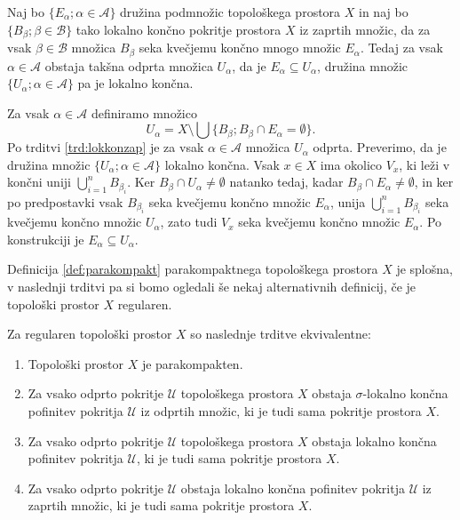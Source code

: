 \documentclass[mat1]{fmfdelo}
\begin{document}
\begin{trditev}\label{trd:lokkonvlozitev}
Naj bo $\lbrace E_\alpha ; \alpha \in \mathcal{A} \rbrace$ družina podmnožic topološkega prostora $X$ in naj bo $\lbrace B_\beta ; \beta \in \mathcal{B} \rbrace$ tako lokalno končno pokritje prostora $X$ iz zaprtih množic, da za vsak $\beta \in \mathcal{B}$ množica $B_\beta$ seka kvečjemu končno mnogo množic $E_\alpha$.
Tedaj za vsak $\alpha \in \mathcal{A}$ obstaja takšna odprta množica $U_\alpha$, da je $E_\alpha \subseteq U_\alpha$, družina množic $\lbrace U_\alpha ; \alpha \in \mathcal{A} \rbrace$ pa je lokalno končna.
\end{trditev}

\begin{dokaz}
Za vsak $\alpha \in \mathcal{A}$ definiramo množico
\[ U_\alpha = X \setminus \bigcup\lbrace B_\beta ; B_\beta \cap E_\alpha = \emptyset\rbrace. \]
Po trditvi \ref{trd:lokkonzap} je za vsak $\alpha \in \mathcal{A}$ množica $U_\alpha$ odprta. Preverimo, da je družina množic $\lbrace U_\alpha ; \alpha \in \mathcal{A} \rbrace$ lokalno končna. Vsak $x \in X$ ima okolico $V_x$, ki leži v končni uniji $\bigcup_{i = 1}^n B_{\beta_i}$. Ker $B_\beta \cap U_\alpha \neq \emptyset$ natanko tedaj, kadar $B_\beta \cap E_\alpha \neq \emptyset$, in ker po predpostavki vsak $B_{\beta_i}$ seka kvečjemu končno množic $E_\alpha$, unija $\bigcup_{i = 1}^n B_{\beta_i}$ seka kvečjemu končno množic $U_\alpha$, zato tudi $V_x$ seka kvečjemu končno množic $E_\alpha$. Po konstrukciji je $E_\alpha \subseteq U_\alpha$.
\end{dokaz}

Definicija \ref{def:parakompakt} parakompaktnega topološkega prostora $X$ je splošna, v naslednji trditvi pa si bomo ogledali še nekaj alternativnih definicij, če je topološki prostor $X$ regularen.

\begin{trditev}\label{trd:parakompkar}
Za regularen topološki prostor $X$ so naslednje trditve ekvivalentne:
\begin{enumerate}
\item Topološki prostor $X$ je parakompakten.\label{podtrd:parakompkar1}
\item Za vsako odprto pokritje $\mathcal{U}$ topološkega prostora $X$ obstaja $\sigma$-lokalno končna pofinitev pokritja $\mathcal{U}$ iz odprtih množic, ki je tudi sama pokritje prostora $X$.\label{podtrd:parakompkar2}
\item Za vsako odprto pokritje $\mathcal{U}$ topološkega prostora $X$ obstaja lokalno končna pofinitev pokritja $\mathcal{U}$, ki je tudi sama pokritje prostora $X$.\label{podtrd:parakompkar3}
\item Za vsako odprto pokritje $\mathcal{U}$ obstaja lokalno končna pofinitev pokritja $\mathcal{U}$ iz zaprtih množic, ki je tudi sama pokritje prostora $X$.\label{podtrd:parakompkar4}
\end{enumerate}
\end{trditev}
\end{document}
